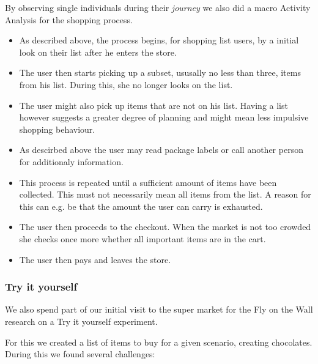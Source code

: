 \documentclass{scrartcl}
\begin{document}
      By observing single individuals during their \textit{journey} we also did a macro Activity Analysis for the shopping process.
      \begin{itemize}
        \item As described above, the process begins, for shopping list users, by a initial look on their list after he enters the store. 
        \item The user then starts picking up a subset, ususally no less than three, items from his list. During this, she no longer looks on the list.
        \item The user might also pick up items that are not on his list. Having a list however suggests a greater degree of planning and might mean less impulsive shopping behaviour.
        \item As descirbed above the user may read package labels or call another person for additionaly information.
        \item This process is repeated until a sufficient amount of items have been collected. 
          This must not necessarily mean all items from the list. A reason for this can e.g. be that the amount the user can carry is exhausted.
        \item The user then proceeds to the checkout. When the market is not too crowded she checks once more whether all important items are in the cart.
        \item The user then pays and leaves the store.
      \end{itemize}

    \subsubsection{Try it yourself}
      We also spend part of our initial visit to the super market for the Fly on the Wall research on a Try it yourself experiment.

      For this we created a list of items to buy for a given scenario, creating chocolates. 
      During this we found several challenges:
\end{document}

